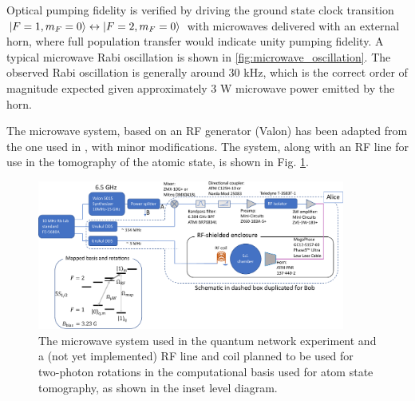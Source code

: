 Optical pumping fidelity is verified by driving the ground state clock transition $\ket{F=1,m_F=0} \leftrightarrow \ket{F=2,m_F=0}$ with microwaves delivered with an external horn, where full population transfer would indicate unity pumping fidelity. A typical microwave Rabi oscillation is shown in \ref{fig:microwave_oscillation}. The observed Rabi oscillation is generally around 30 kHz, which is the correct order of magnitude expected given approximately 3 W microwave power emitted by the horn\cite{kwon2019rydberg}.


The microwave system, based on an RF generator (Valon) has been adapted from the one used in \cite{Young2022thesis,kwon2019rydberg}, with minor modifications. The system, along with an RF line for use in the tomography of the atomic state, is shown in Fig. \ref{fig:microwave_system}.

\begin{figure}[!ht]
    \centering
    \includegraphics[width=0.9\textwidth]{Images/microwave_system_schematic.pdf}
    \caption{The microwave system used in the quantum network experiment and a (not yet implemented) RF line and coil planned to be used for two-photon rotations in the computational basis used for atom state tomography, as shown in the inset level diagram.}
    \label{fig:microwave_system}
\end{figure}
